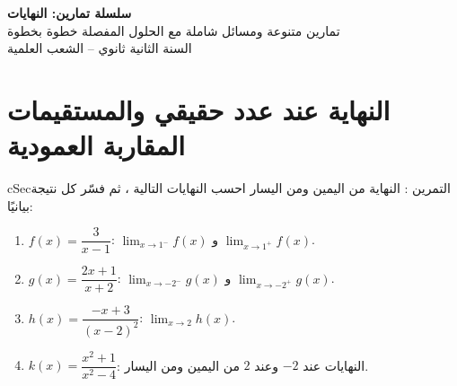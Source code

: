 \documentclass[12pt,a4paper]{article}
\newenvironment{BOX}[2]{\begin{otherlanguage}{english}\begin{arbox}{#1}{#2}}{\end{arbox}\end{otherlanguage}}
\newcounter{exo}
\newenvironment{tamrin}[1]{\stepcounter{exo}\begin{BOX}{cSec}{التمرين \theexo: #1}}{\end{BOX}}
\newenvironment{LTR}{\begin{otherlanguage}{english}}{\end{otherlanguage}}
\newcommand{\Lm}[1]{\displaystyle\lim_{x\to#1}}
\begin{document}
\begin{LTR}
\begin{tcolorbox}[enhanced,colback=cSec!10,colframe=cSec!40,arc=3mm,halign=center,boxrule=0.6pt,top=12pt,bottom=12pt,before upper={\selectlanguage{arabic}}]
{\color{cSec}\fontsize{28}{34}\selectfont\bfseries سلسلة تمارين: النهايات}\\[8pt]
{\color{cSec!80!black}\large تمارين متنوعة ومسائل شاملة مع الحلول المفصلة خطوة بخطوة}\\[5pt]
{\color{cSec!80!black}\large السنة الثانية ثانوي -- الشعب العلمية}
\end{tcolorbox}
\end{LTR}

\section{النهاية عند عدد حقيقي والمستقيمات المقاربة العمودية}
\begin{tamrin}{النهاية من اليمين ومن اليسار}
احسب النهايات التالية ، ثم فسّر كل نتيجة بيانيًا:
\begin{enumerate}
\item $f(x)=\dfrac3{x-1}$: \quad $\Lm{1^-}f(x)$ و $\Lm{1^+}f(x)$.
\item $g(x)=\dfrac{2x+1}{x+2}$: \quad $\Lm{-2^-}g(x)$ و $\Lm{-2^+}g(x)$.
\item $h(x)=\dfrac{-x+3}{(x-2)^2}$: \quad $\Lm{2}h(x)$.
\item $k(x)=\dfrac{x^2+1}{x^2-4}$: \quad النهايات عند $-2$ وعند $2$ من اليمين ومن اليسار.
\end{enumerate}
\end{tamrin}
\end{document}
